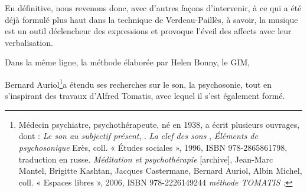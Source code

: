 En définitive, nous revenons donc, avec d'autres façons d'intervenir,
à ce qui a été déjà formulé plus haut dans la technique de Verdeau-Paillès,
à savoir, la musique est un outil déclencheur des expressions et provoque
l'éveil des affects avec leur verbalisation.

Dans la même ligne, la méthode élaborée par Helen Bonny, le GIM,

Bernard Auriol\footnote{Médecin psychiatre, psychothérapeute, né en 1938, a écrit plusieurs
ouvrages, dont : \emph{Le son au subjectif présent}, \cite{auriol96sonausubjectifpresent}. 
\emph{ La clef des sons} \cite{Auri96:clesons},
\emph{Éléments de psychosonique}  Erès, coll. « Études
sociales », 1996, ISBN 978-2865861798, traduction en russe. \emph{Méditation
et psychothérapie} {[}archive{]}, Jean-Marc Mantel, Brigitte Kashtan,
Jacques Castermane, Bernard Auriol, Albin Michel, coll. « Espaces
libres », 2006, ISBN 978-2226149244\emph{ méthode TOMATIS :} }a étendu ses recherches sur le son, la psychosonie, tout en s'inspirant
des travaux d'Alfred Tomatis, avec lequel il s'est également formé.
